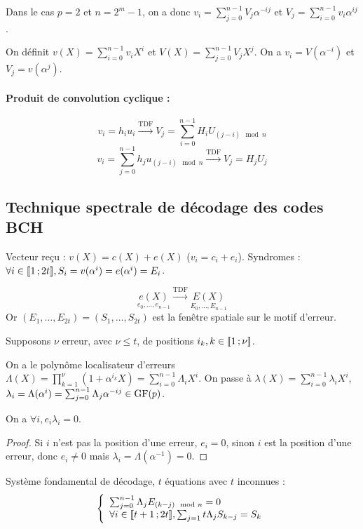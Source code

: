 	Dans le cas $p = 2$ et $n = 2^m - 1$, on a donc $v_i = \sum_{j = 0}^{n - 1} V_j \alpha^{-ij}$ et $V_j = \sum_{i = 0}^{n - 1} v_i \alpha^{ij}$.
	
	On définit $v(X) = \sum_{i = 0}^{n - 1} v_i X^i$ et $V(X) = \sum_{j = 0}^{n - 1} V_j X^j$.
	On a $v_i = V(\alpha^{-i})$ et $V_j = v(\alpha^j)$.

	\paragraph{Produit de convolution cyclique :}
	$$v_i = h_i u_i \overset{\text{TDF}}{\longrightarrow} V_j = \sum_{i = 0}^{n - 1} H_i U_{(j - i) \mod{n}}$$
	$$v_i = \sum_{j = 0}^{n - 1} h_j u_{(j - i) \mod{n}} \overset{\text{TDF}}{\longrightarrow} V_j = H_j U_j$$


\subsection{Technique spectrale de décodage des codes BCH}

	Vecteur reçu : $v(X) = c(X) + e(X)$ ($v_i = c_i + e_i$).
	Syndromes : $\forall i \in \mathopen{}\mathclose{\left[\![1\mathclose{}\mathpunct{};2t\right]\!]}, S_i = v(\alpha^i) = e(\alpha^i) = E_i$.

	$$\underset{e_0,\ldots,e_{n - 1}}{e(X)} \overset{\text{TDF}}{\longrightarrow} \underset{E_0,\ldots,E_{n - 1}}{E(X)}$$
	Or $(E_1,\ldots,E_{2t}) = (S_1,\ldots,S_{2t})$ est la fenêtre spatiale sur le motif d'erreur.

	Supposons $\nu$ erreur, avec $\nu \leq t$, de positions $i_k, k \in \mathopen{}\mathclose{\left[\![1\mathclose{}\mathpunct{};\nu\right]\!]}$.

	On a le polynôme localisateur d'erreurs $\Lambda(X) = \prod_{k = 1}^{\nu} (1 + \alpha^{i_k} X) = \sum_{i = 0}^{n - 1} \Lambda_i X^i$.
	On passe à $\lambda(X) = \sum_{i = 0}^{n - 1} \lambda_i X^i$, $\lambda_i = \Lambda(\alpha^i) = \sum_{j = 0}^{n - 1} \Lambda_j \alpha^{-ij} \in \mathrm{GF}(p)$.
	
	\begin{pop}
		On a $\forall i, e_i \lambda_i = 0$.
	\end{pop}

	\begin{proof}
		Si $i$ n'est pas la position d'une erreur, $e_i = 0$, sinon $i$ est la position d'une erreur, donc $e_i \neq 0$ mais $\lambda_i = \Lambda(\alpha^{-1}) = 0$.
	\end{proof}

	Système fondamental de décodage, $t$ équations avec $t$ inconnues :
	$$\left\{ \begin{array}{l}
		\sum_{j = 0}^{n - 1} \Lambda_j E_{(k - j) \mod{n}} = 0 \\
		\forall i \in \mathopen{}\mathclose{\left[\![t + 1\mathclose{}\mathpunct{};2t\right]\!]}, \sum_{j = 1}{t} \Lambda_j S_{k - j} = S_k
		\end{array} \right.$$

